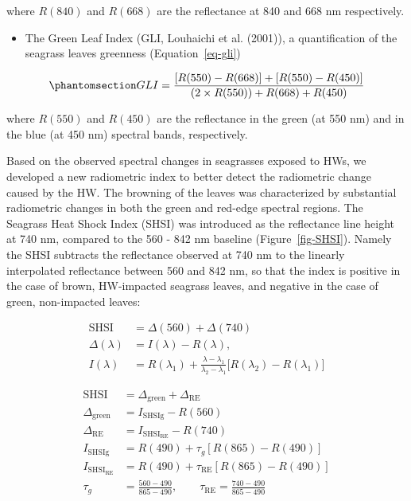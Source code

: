 \documentclass[
  letterpaper,
  DIV=11,
  numbers=noendperiod]{scrartcl}
\providecommand{\tightlist}{%
  \setlength{\itemsep}{0pt}\setlength{\parskip}{0pt}}
\begin{document}
where \(R(840)\) and \(R(668)\) are the reflectance at 840 and 668 nm
respectively.

\begin{itemize}
\tightlist
\item
  The Green Leaf Index (GLI, Louhaichi et al. (2001)), a quantification
  of the seagrass leaves greenness (Equation~\ref{eq-gli})
\end{itemize}

\begin{equation}\phantomsection\label{eq-gli}{
GLI = \frac{[R(550)-R(668)]+[R(550)-R(450)]}{(2 \times R(550) )+ R(668) + R(450) }
}\end{equation}

where \(R(550)\) and \(R(450)\) are the reflectance in the green (at 550
nm) and in the blue (at 450 nm) spectral bands, respectively.

Based on the observed spectral changes in seagrasses exposed to HWs, we
developed a new radiometric index to better detect the radiometric
change caused by the HW. The browning of the leaves was characterized by
substantial radiometric changes in both the green and red-edge spectral
regions. The Seagrass Heat Shock Index (SHSI) was introduced as the
reflectance line height at 740 nm, compared to the 560 - 842 nm baseline
(Figure~\ref{fig-SHSI}). Namely the SHSI subtracts the reflectance
observed at 740 nm to the linearly interpolated reflectance between 560
and 842 nm, so that the index is positive in the case of brown,
HW-impacted seagrass leaves, and negative in the case of green,
non-impacted leaves:

\[
\begin{aligned}
\mathrm{SHSI} &= \Delta(560) + \Delta(740) \\[6pt]
\Delta(\lambda) &= I(\lambda) - R(\lambda) , \\[8pt]
I(\lambda) &= R(\lambda_1) +
\frac{\lambda - \lambda_1}{\lambda_2 - \lambda_1}
\big[ R(\lambda_2) - R(\lambda_1) \big]
\end{aligned}
\]

\[
\begin{aligned}
\mathrm{SHSI} &= \Delta_{\mathrm{green}} + \Delta_{\mathrm{RE}} \\[6pt]
\Delta_{\mathrm{green}} &= I_{\mathrm{SHSIg}} - R(560) \\[6pt]
\Delta_{\mathrm{RE}} &= I_{\mathrm{SHSI_{RE}}} - R(740) \\[6pt]
I_{\mathrm{SHSIg}} &= R(490) + \tau_g \left[ R(865) - R(490) \right] \\[6pt]
I_{\mathrm{SHSI_{RE}}} &= R(490) + \tau_{\mathrm{RE}} \left[ R(865) - R(490) \right] \\[6pt]
\tau_g &= \frac{560 - 490}{865 - 490}, \qquad
\tau_{\mathrm{RE}} = \frac{740 - 490}{865 - 490}
\end{aligned}
\]
\end{document}

